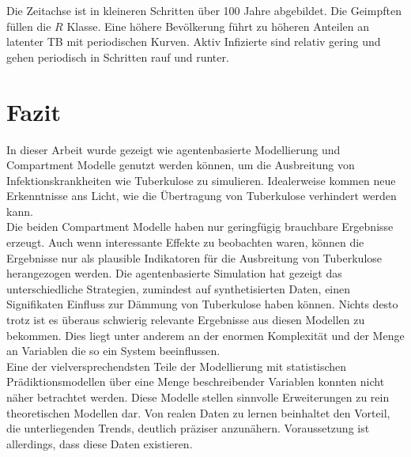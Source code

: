 \documentclass[paper=a4, fontsize=11pt, ngerman, abstract=on]{scrartcl}
\numberwithin{equation}{section} %
\numberwithin{figure}{section} %
\numberwithin{table}{section} %
\begin{document}
Die Zeitachse ist in kleineren Schritten über 100 Jahre abgebildet. Die Geimpften füllen die $R$ Klasse. Eine höhere Bevölkerung führt zu höheren Anteilen an latenter TB mit periodischen Kurven. Aktiv Infizierte sind relativ gering und gehen periodisch in Schritten rauf und runter.

\newpage

\section{Fazit}

In dieser Arbeit wurde gezeigt wie agentenbasierte Modellierung und Compartment Modelle genutzt werden können, um die Ausbreitung von Infektionskrankheiten wie Tuberkulose zu simulieren. Idealerweise kommen neue Erkenntnisse ans Licht, wie die Übertragung von Tuberkulose verhindert werden kann. \\

Die beiden Compartment Modelle haben nur geringfügig brauchbare Ergebnisse erzeugt. Auch wenn interessante Effekte zu beobachten waren, können die Ergebnisse nur als plausible Indikatoren für die Ausbreitung von Tuberkulose herangezogen werden. Die agentenbasierte Simulation hat gezeigt das unterschiedliche Strategien, zumindest auf synthetisierten Daten, einen Signifikaten Einfluss zur Dämmung von Tuberkulose haben können. Nichts desto trotz ist es überaus schwierig relevante Ergebnisse aus diesen Modellen zu bekommen. Dies liegt unter anderem an der enormen Komplexität und der Menge an Variablen die so ein System beeinflussen. \\

Eine der vielversprechendsten Teile der Modellierung mit statistischen Prädiktionsmodellen über eine Menge beschreibender Variablen konnten nicht näher betrachtet werden. Diese Modelle stellen sinnvolle Erweiterungen zu rein theoretischen Modellen dar. Von realen Daten zu lernen beinhaltet den Vorteil, die unterliegenden Trends, deutlich präziser anzunähern. Voraussetzung ist allerdings, dass diese Daten existieren.

\newpage



\end{document}

